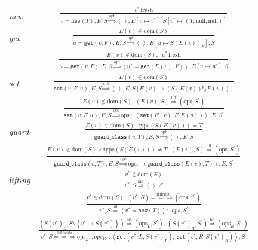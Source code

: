 \documentclass[preprint]{sigplanconf}
\begin{document}
\begin{figure}
\begin{center}
\begin{tabular}{lc}
\emph{new} & ${\displaystyle \frac{v^{*}\,\mathrm{fresh}}{v=\mathtt{new}(T),E,S\overset{\mathrm{opt}}{\Longrightarrow}\left\langle \,\right\rangle ,E\left[v\mapsto v^{*}\right],S\left[v^{*}\mapsto\left(T,\mathrm{null,null}\right)\right]}}$\tabularnewline[3em]
\emph{get} & ${\displaystyle \frac{E(v)\in\mathrm{dom}(S)}{u=\mathtt{get}(v,F),E,S\overset{\mathrm{opt}}{\Longrightarrow}\left\langle \,\right\rangle ,E\left[u\mapsto S(E(v))_{F}\right],S}}$\tabularnewline[3em]
 & ${\displaystyle \frac{E(v)\notin\mathrm{dom}(S),\,\,\, u^{*}\,\mathrm{fresh}}{u=\mathtt{get}(v,F),E,S\overset{\mathrm{opt}}{\Longrightarrow}\left\langle u^{*}=\mathtt{get}(E(v),F)\right\rangle ,E\left[u\mapsto u^{*}\right],S}}$\tabularnewline[3em]
\emph{set} & ${\displaystyle \frac{E(v)\in\mathrm{dom}(S)}{\mathtt{set}\left(v,F,u\right),E,S\overset{\mathrm{opt}}{\Longrightarrow}\left\langle \,\right\rangle ,E,S\left[E\left(v\right)\mapsto\left(S(E(v))!_{F}E(u)\right)\right]}}$\tabularnewline[3em]
 & ${\displaystyle \frac{E(v)\notin\mathrm{dom}\left(S\right),\,\left(E(v),S\right)\overset{\mathrm{lift}}{\Longrightarrow}\left(\mathrm{ops},S^{\prime}\right)}{\mathtt{set}\left(v,F,u\right),E,S\overset{\mathrm{opt}}{\Longrightarrow}\mathrm{ops}::\left\langle \mathtt{set}\left(E(v),F,E(u)\right)\right\rangle ,E,S^{\prime}}}$\tabularnewline[3em]
\emph{guard} & ${\displaystyle \frac{E(v)\in\mathrm{dom}(S),\,\mathrm{type}(S(E(v)))=T}{\mathtt{guard\_class}(v,T),E,S\overset{\mathrm{opt}}{\Longrightarrow}\left\langle \,\right\rangle ,E,S}}$\tabularnewline[3em]
 & ${\displaystyle \frac{E(v)\notin\mathrm{dom}(S)\vee\mathrm{type}(S(E(v)))\neq T,\,\left(E(v),S\right)\overset{\mathrm{lift}}{\Longrightarrow}\left(\mathrm{ops},S^{\prime}\right)}{\mathtt{guard\_class}(v,T),E,S\overset{\mathrm{opt}}{\Longrightarrow}\mathrm{ops}::\left\langle \mathtt{guard\_class}(E\left(v\right),T)\right\rangle ,E,S^{\prime}}}$\tabularnewline[3em]
\emph{lifting} & ${\displaystyle \frac{v^{*}\notin\mathrm{dom}(S)}{v^{*},S\overset{\mathrm{lift}}{\Longrightarrow}\left\langle \,\right\rangle ,S}}$\tabularnewline[3em]
 & ${\displaystyle \frac{v^{*}\in\mathrm{dom}(S),\,\left(v^{*},S\right)\overset{\mathrm{liftfields}}{=\!=\!\Longrightarrow}\left(\mathrm{ops},S^{\prime}\right)}{v^{*},S\overset{\mathrm{lift}}{\Longrightarrow}\left\langle v^{*}=\mathtt{new}\left(T\right)\right\rangle ::ops,S^{\prime}}}$\tabularnewline[3em]
 & ${\displaystyle \frac{\left(S\left(v^{*}\right)_{L},S\setminus\left\{ v^{*}\mapsto S\left(v^{*}\right)\right\} \right)\overset{\mathrm{lift}}{\Longrightarrow}\left(\mathrm{ops}_{L},S^{\prime}\right),\,\left(S\left(v^{*}\right)_{R},S^{\prime}\right)\overset{\mathrm{lift}}{\Longrightarrow}\left(\mathrm{ops}_{R},S^{\prime\prime}\right)}{v^{*},S\overset{\mathrm{liftfields}}{=\!=\!\Longrightarrow}\mathrm{ops}_{L}::ops_{R}::\left\langle \mathtt{set}\left(v^{*},L,S\left(v^{*}\right)_{L}\right),\,\mathtt{set}\left(v^{*},R,S\left(v^{*}\right)_{R}\right)\right\rangle ,S^{\prime}}}$\tabularnewline[3em]
\end{tabular}
\end{center}


\end{figure}
\end{document}
